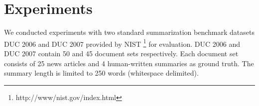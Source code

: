 \documentclass[11pt,a4paper]{article}
\begin{document}








 



\section{Experiments}

We conducted experiments with two standard summarization benchmark datasets DUC 2006 and DUC 2007 provided by NIST \footnote{http://www/nist.gov/index.html} for evaluation. DUC 2006 and DUC 2007 contain 50 and 45 document sets respectively. Each document set consists of 25 news articles and 4 human-written summaries as ground truth. The summary length is limited to 250 words (whitespace delimited).
\end{document}
